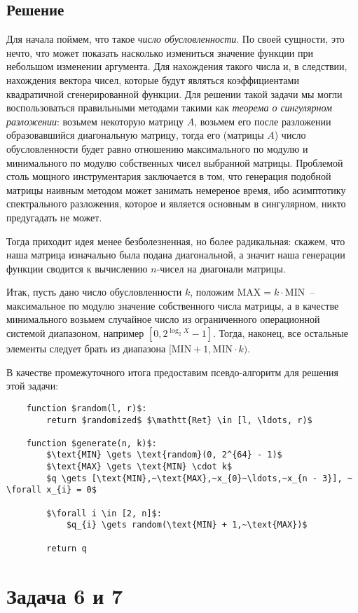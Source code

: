 \documentclass[12pt, a4paper, oneside, final]{article}
\begin{document}
	\subsection*{Решение}
	Для начала поймем, что такое \textit{число обусловленности}. По своей сущности, это нечто, что может показать насколько измениться значение функции при небольшом изменении аргумента. Для нахождения такого числа и, в следствии, нахождения вектора чисел, которые будут являться коэффициентами квадратичной сгенерированной функции. Для решении такой задачи мы могли воспользоваться правильными методами такими как \textit{теорема о сингулярном разложении}: возьмем некоторую матрицу $A$, возьмем его после разложении образовавшийся диагональную матрицу, тогда его (матрицы $A$) число обусловленности будет равно отношению максимального по модулю и минимального по модулю собственных чисел выбранной матрицы. Проблемой столь мощного инструментария заключается в том, что генерация подобной матрицы наивным методом может занимать немереное время, ибо асимптотику спектрального разложения, которое и является основным в сингулярном, никто предугадать не может.

	Тогда приходит идея менее безболезненная, но более радикальная: скажем, что наша матрица изначально была подана диагональной, а значит наша генерации функции сводится к вычислению $n$-чисел на диагонали матрицы.

	Итак, пусть дано число обусловленности $k$, положим $\text{MAX} = k \cdot \text{MIN}$~-- максимальное по модулю значение собственного числа матрицы, а в качестве минимального возьмем случайное число из ограниченного операционной системой диапазоном, например $[0, 2^{\log_{2}{X}} - 1]$. Тогда, наконец, все остальные элементы следует брать из диапазона $[\text{MIN} + 1, \text{MIN} \cdot k)$.

	В качестве промежуточного итога предоставим псевдо-алгоритм для решения этой задачи:
	\begin{lstlisting}
	function $random(l, r)$:
		return $randomized$ $\mathtt{Ret} \in [l, \ldots, r)$

	function $generate(n, k)$:
		$\text{MIN} \gets \text{random}(0, 2^{64} - 1)$
		$\text{MAX} \gets \text{MIN} \cdot k$
		$q \gets [\text{MIN},~\text{MAX},~x_{0}~\ldots,~x_{n - 3}], ~ \forall x_{i} = 0$

		$\forall i \in [2, n]$:
			$q_{i} \gets random(\text{MIN} + 1,~\text{MAX})$

		return q
	\end{lstlisting}
	\newpage
	\section*{Задача 6 и 7}
\end{document}
